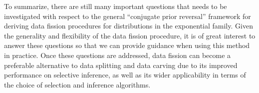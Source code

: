 To summarize, there are still many important questions that needs to be investigated with respect to the general ``conjugate prior reversal'' framework for deriving data fission procedures for distributions in the exponential family. Given the generality and flexibility of the data fission procedure, it is of great interest to answer these questions so that we can provide guidance when using this method in practice. Once these questions are addressed, data fission can become a preferable alternative to data splitting and data carving due to its improved performance on selective inference, as well as its wider applicability in terms of the choice of selection and inference algorithms.